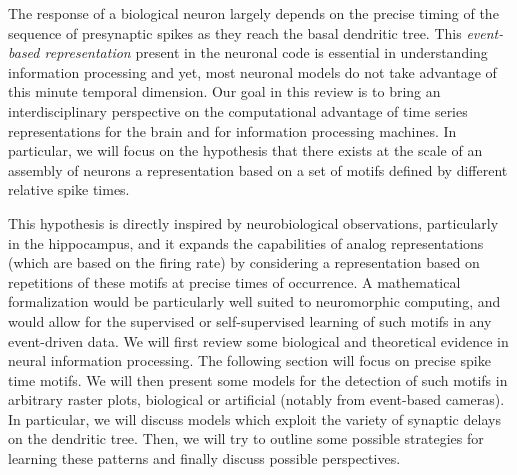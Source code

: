 \documentclass[brainsci, %
               review,submit,pdftex,moreauthors]{Definitions/mdpi}
\begin{document}
The response of a biological neuron largely depends on the precise timing of the sequence of presynaptic spikes as they reach the basal dendritic tree. This \emph{event-based representation} present in the neuronal code is essential in understanding information processing and yet, most neuronal models do not take advantage of this minute temporal dimension. Our goal in this review is to bring an interdisciplinary perspective on the computational advantage of time series representations for the brain and for information processing machines. In particular, we will focus on the hypothesis that there exists at the scale of an assembly of neurons a representation based on a set of motifs defined by different relative spike times. %

This hypothesis is directly inspired by neurobiological observations, particularly in the hippocampus, and it expands the capabilities of analog representations (which are based on the firing rate) by considering a representation based on repetitions of these motifs at precise times of occurrence. A mathematical formalization would be particularly well suited to neuromorphic computing, and would allow for the supervised or self-supervised learning of such motifs in any event-driven data. We will first review some biological and theoretical evidence in neural information processing. The following section will focus on precise spike time motifs. We will then present some models for the detection of such motifs in arbitrary raster plots, biological or artificial (notably from event-based cameras). In particular, we will discuss models which exploit the variety of synaptic delays on the dendritic tree. Then, we will try to outline some possible strategies for learning these patterns and finally discuss possible perspectives.
%
\end{document}
